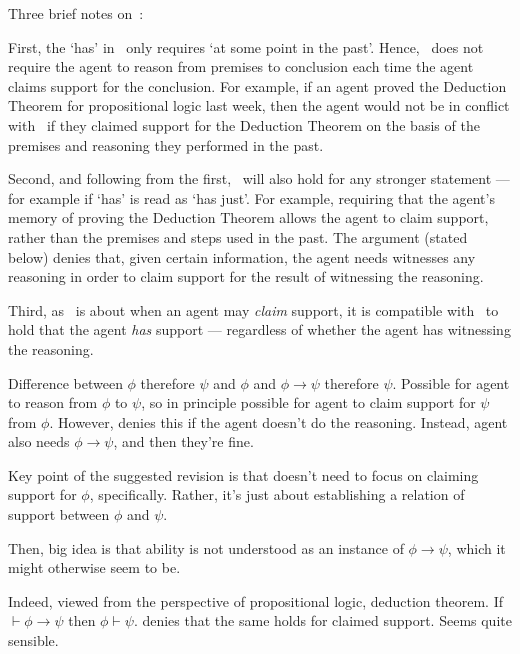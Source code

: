 \begin{note}
  Three brief notes on~\ESU{}:

      First, the `has' in~\ESU{} only requires `at some point in the past'.
      Hence,~\ESU{} does not require the agent to reason from premises to conclusion each time the agent claims support for the conclusion.
      For example, if an agent proved the Deduction Theorem for propositional logic last week, then the agent would not be in conflict with~\ESU{} if they claimed support for the Deduction Theorem on the basis of the premises and reasoning they performed in the past.

      Second, and following from the first,~\ESU{} will also hold for any stronger statement --- for example if `has' is read as `has just'.
      For example, requiring that the agent's memory of proving the Deduction Theorem allows the agent to claim support, rather than the premises and steps used in the past.
      The argument (stated below) denies that, given certain information, the agent needs witnesses any reasoning in order to claim support for the result of witnessing the reasoning.

      Third, as~\ESU{} is about when an agent may \emph{claim} support, it is compatible with~\ESU{} to hold that the agent \emph{has} support --- regardless of whether the agent has witnessing the reasoning.
\end{note}

\begin{note}[Simplest]
  \color{red}
  Difference between \(\phi\) therefore \(\psi\) and \(\phi\) and \(\phi \rightarrow \psi\) therefore \(\psi\).
  Possible for agent to reason from \(\phi\) to \(\psi\), so in principle possible for agent to claim support for \(\psi\) from \(\phi\).
  However, \ESU{} denies this if the agent doesn't do the reasoning.
  Instead, agent also needs \(\phi \rightarrow \psi\), and then they're fine.

  Key point of the suggested revision is that \ESU{} doesn't need to focus on claiming support for \(\phi\), specifically.
  Rather, it's just about establishing a relation of support between \(\phi\) and \(\psi\).

  Then, big idea is that ability is not understood as an instance of \(\phi \rightarrow \psi\), which it might otherwise seem to be.

  Indeed, viewed from the perspective of propositional logic, deduction theorem.
  If \(\vdash \phi \rightarrow \psi\) then \(\phi \vdash \psi\).
  \ESU{} denies that the same holds for claimed support.
  Seems quite sensible.
\end{note}

